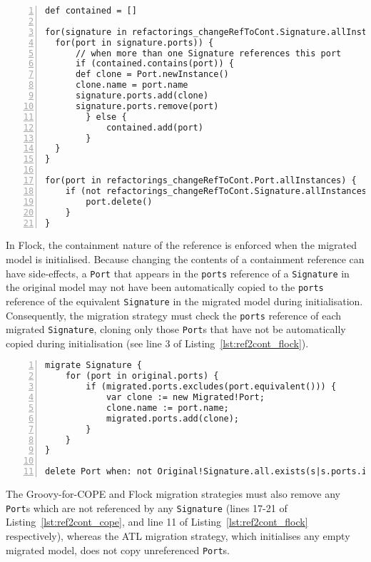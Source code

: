 \begin{lstlisting}[basicstyle=\ttfamily\footnotesize, flexiblecolumns=true, numbers=left, nolol=true, caption=Change R to C model migration in COPE, label=lst:ref2cont_cope, language=COPE, tabsize=2]
def contained = []

for(signature in refactorings_changeRefToCont.Signature.allInstances) {
  for(port in signature.ports)) {
	  // when more than one Signature references this port
	  if (contained.contains(port)) {
      def clone = Port.newInstance()
      clone.name = port.name
      signature.ports.add(clone)
      signature.ports.remove(port)
		} else {
			contained.add(port)
		}
  }
}

for(port in refactorings_changeRefToCont.Port.allInstances) {
	if (not refactorings_changeRefToCont.Signature.allInstances.any { it.ports.contains(port) }) {
	  	port.delete()
	}
}
\end{lstlisting}

In Flock, the containment nature of the reference is enforced when the migrated model is initialised. Because changing the contents of a containment reference can have side-effects, a \texttt{Port} that appears in the \texttt{ports} reference of a \texttt{Signature} in the original model may not have been automatically copied to the \texttt{ports} reference of the equivalent \texttt{Signature} in the migrated model during initialisation. Consequently, the migration strategy must check the \texttt{ports} reference of each migrated \texttt{Signature}, cloning only those \texttt{Port}s that have not be automatically copied during initialisation (see line 3 of Listing~\ref{lst:ref2cont_flock}).

\begin{lstlisting}[basicstyle=\ttfamily\footnotesize, flexiblecolumns=true, numbers=left, nolol=true, caption=Change R to C model migration in Flock, label=lst:ref2cont_flock, language=Flock, tabsize=2]
migrate Signature {
	for (port in original.ports) {
		if (migrated.ports.excludes(port.equivalent())) {
			var clone := new Migrated!Port;
			clone.name := port.name;
			migrated.ports.add(clone);
		}
	}
}

delete Port when: not Original!Signature.all.exists(s|s.ports.includes(original))
\end{lstlisting}


The Groovy-for-COPE and Flock migration strategies must also remove any \texttt{Port}s which are not referenced by any \texttt{Signature} (lines 17-21 of Listing~\ref{lst:ref2cont_cope}, and line 11 of Listing~\ref{lst:ref2cont_flock} respectively), whereas the ATL migration strategy, which initialises any empty migrated model, does not copy unreferenced \texttt{Port}s.

